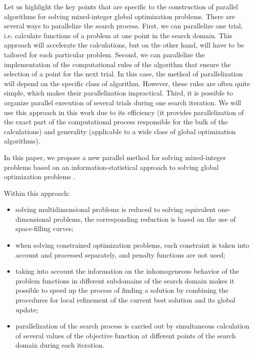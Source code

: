 \documentclass[
11pt,%
tightenlines,%
twoside,%
onecolumn,%
nofloats,%
nobibnotes,%
nofootinbib,%
superscriptaddress,%
noshowpacs,%
centertags]%
{revtex4}
\begin{document}
Let us highlight the key points that are specific to the construction of parallel algorithms for solving mixed-integer global optimization problems. There are several ways to parallelize the search process.
First, we can parallelize one trial, i.e. calculate functions of a problem at one point in the search domain. This approach will accelerate the calculations, but on the other hand, will have to be tailored for each particular problem.
Second, we can parallelize the implementation of the computational rules of the algorithm that ensure the selection of a point for the next trial. In this case, the method of parallelization will depend on the specific class of algorithm. However, these rules are often quite simple, which makes their parallelization impractical.
Third, it is possible to organize parallel execution of several trials during one search iteration. We will use this approach in this work due to its efficiency (it provides parallelization of the exact part of the computational process responsible for the bulk of the calculations) and generality (applicable to a wide class of global optimization algorithms).

In this paper, we propose a new parallel method for solving mixed-integer problems based on an information-statistical approach to solving global optimization problems \cite{Strongin2000,Strongin2013}. 

Within this approach: 
\begin{itemize}
	\item 
	solving multidimensional problems is reduced to solving equivalent one-dimensional problems, the corresponding reduction is based on the use of space-filling curves;
	\item 
	when solving constrained optimization problems, each constraint is taken into account and processed separately, and penalty functions are not used;
	\item
	taking into account the information on the inhomogeneous behavior of the problem functions in different subdomains of the search domain makes it possible to speed up the process of finding a solution by combining the procedures for local refinement of the current best solution and its global update;
	\item 
	parallelization of the search process is carried out by simultaneous calculation of several values of the objective function at different points of the search domain during each iteration.	
\end{itemize}
\end{document}
